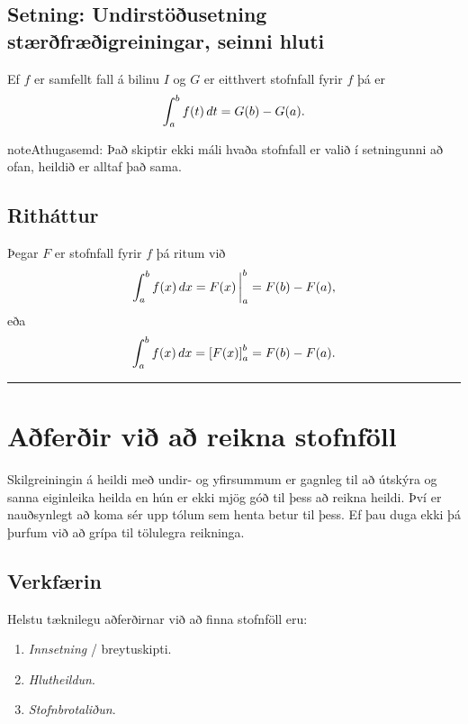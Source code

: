\documentclass[a4paper,10pt,icelandic]{sphinxmanual}
\begin{document}

\subsection{Setning: Undirstöðusetning stærðfræðigreiningar, seinni hluti}
\label{kafli06:index-8}\label{kafli06:setning-undirstousetning-staerfraeigreiningar-seinni-hluti}
Ef \(f\) er samfellt fall á bilinu \(I\) og \(G\) er
eitthvert stofnfall fyrir \(f\) þá er
\begin{gather}
\begin{split}\int_a^b f(t)\,dt=G(b)-G(a).\end{split}\notag
\end{gather}
\begin{notice}{note}{Athugasemd:}
Það skiptir ekki máli hvaða stofnfall er valið í setningunni að ofan,
heildið er alltaf það sama.
\end{notice}


\subsection{Ritháttur}
\label{kafli06:rithattur}
Þegar \(F\) er stofnfall fyrir \(f\) þá ritum við
\begin{gather}
\begin{split}\int_a^b f(x)\,dx=F(x)\,\bigg|_a^b= F(b)-F(a),\end{split}\notag
\end{gather}
eða
\begin{gather}
\begin{split}\int_a^b f(x)\,dx=\left[F(x)\right]_a^b= F(b)-F(a).\end{split}\notag
\end{gather}

\bigskip\hrule{}\bigskip



\section{Aðferðir við að reikna stofnföll}
\label{kafli06:aferir-vi-a-reikna-stofnfoll}
Skilgreiningin á heildi með undir- og yfirsummum er gagnleg til að útskýra
og sanna eiginleika heilda en hún er ekki mjög góð til þess að reikna
heildi. Því er nauðsynlegt að koma sér upp tólum sem henta betur til þess.
Ef þau duga ekki þá þurfum við að grípa til tölulegra reikninga.


\subsection{Verkfærin}
\label{kafli06:verkfaerin}
Helstu tæknilegu aðferðirnar við að finna stofnföll eru:
\begin{enumerate}
\item {} 
\textit{Innsetning} / breytuskipti.

\item {} 
\textit{Hlutheildun}.

\item {} 
\textit{Stofnbrotaliðun}.

\end{enumerate}
\end{document}
